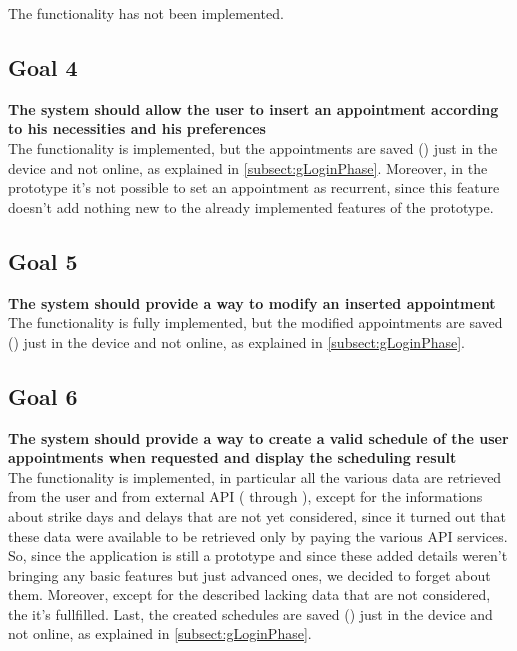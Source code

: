 The functionality has not been implemented.

\subsection{Goal 4} \label{subsect:gAppointmentCreation}
\textbf{The system should allow the user to insert an appointment according to his necessities and his preferences}\\

The functionality is implemented, but the appointments are saved () just in the device and not online, as explained in \ref{subsect:gLoginPhase}. Moreover, in the prototype it's not possible to set an appointment as recurrent, since this feature doesn't add nothing new to the already implemented features of the prototype.

\subsection{Goal 5} \label{subsect:gAppointmentModification}
\textbf{The system should provide a way to modify an inserted appointment}\\

The functionality is fully implemented, but the modified appointments are saved () just in the device and not online, as explained in \ref{subsect:gLoginPhase}.

\subsection{Goal 6}
\label{subsect:gScheduleCreation}
\textbf{The system should provide a way to create a valid schedule of the user appointments when requested and display the scheduling result}\\

The functionality is implemented, in particular all the various data are retrieved from the user and from external API ( through ), except for the informations about strike days and delays that are not yet considered, since it turned out that these data were available to be retrieved only by paying the various API services. So, since the application is still a prototype and since these added details weren't bringing any basic features but just advanced ones, we decided to forget about them. Moreover, except for the described lacking data that are not considered, the  it's fullfilled. Last, the created schedules are saved () just in the device and not online, as explained in \ref{subsect:gLoginPhase}.

